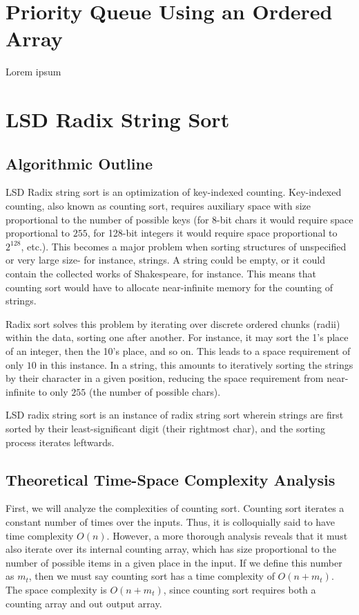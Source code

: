 \documentclass[12pt]{amsart}
\begin{document}
\section{Priority Queue Using an Ordered Array}
    Lorem ipsum

\section{LSD Radix String Sort}

    \subsection{Algorithmic Outline}

    LSD Radix string sort is an optimization of key-indexed
    counting. Key-indexed counting, also known as counting sort,
    requires auxiliary space with size proportional to the
    number of possible keys (for 8-bit chars it would require
    space proportional to $255$, for 128-bit integers it would
    require space proportional to $2^{128}$, etc.). This
    becomes a major problem when sorting structures of
    unspecified or very large size- for instance, strings. A
    string could be empty, or it could contain the collected
    works of Shakespeare, for instance. This means that counting
    sort would have to allocate near-infinite memory for the
    counting of strings.

    Radix sort solves this problem by iterating over discrete
    ordered chunks (radii) within the data, sorting one after
    another. For instance, it may sort the 1's place of an
    integer, then the 10's place, and so on. This leads to a
    space requirement of only $10$ in this instance. In a
    string, this amounts to iteratively sorting the strings by
    their character in a given position, reducing the space
    requirement from near-infinite to only $255$ (the number of
    possible chars).

    LSD radix string sort is an instance of radix string sort
    wherein strings are first sorted by their least-significant
    digit (their rightmost char), and the sorting process
    iterates leftwards.

    \subsection{Theoretical Time-Space Complexity Analysis}

    First, we will analyze the complexities of counting sort.
    Counting sort iterates a constant number of times over the
    inputs. Thus, it is colloquially said to have time
    complexity $O(n)$. However, a more thorough analysis reveals
    that it must also iterate over its internal counting array,
    which has size proportional to the number of possible items
    in a given place in the input. If we define this number as
    $m_t$, then we must say counting sort has a time complexity of
    $O(n + m_t)$. The space complexity is $O(n + m_t)$, since
    counting sort requires both a counting array and out output
    array.
\end{document}
